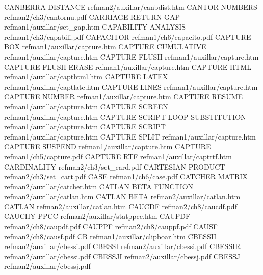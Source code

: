 CANBERRA DISTANCE                       refman2/auxillar/canbdist.htm
CANTOR NUMBERS                          refman2/ch3/cantornu.pdf
CARRIAGE RETURN GAP                     refman1/auxillar/set_gap.htm
CAPABILITY ANALYSIS                     refman1/ch3/capabili.pdf
CAPACITOR                               refman1/ch6/capacito.pdf
CAPTURE BOX                             refman1/auxillar/capture.htm
CAPTURE CUMULATIVE                      refman1/auxillar/capture.htm
CAPTURE FLUSH                           refman1/auxillar/capture.htm
CAPTURE FLUSH ERASE                     refman1/auxillar/capture.htm
CAPTURE HTML                            refman1/auxillar/capthtml.htm
CAPTURE LATEX                           refman1/auxillar/captlate.htm
CAPTURE LINES                           refman1/auxillar/capture.htm
CAPTURE NUMBER                          refman1/auxillar/capture.htm
CAPTURE RESUME                          refman1/auxillar/capture.htm
CAPTURE SCREEN                          refman1/auxillar/capture.htm
CAPTURE SCRIPT LOOP SUBSTITUTION        refman1/auxillar/capture.htm
CAPTURE SCRIPT                          refman1/auxillar/capture.htm
CAPTURE SPLIT                           refman1/auxillar/capture.htm
CAPTURE SUSPEND                         refman1/auxillar/capture.htm
CAPTURE                                 refman1/ch5/capture.pdf
CAPTURE RTF                             refman1/auxillar/captrtf.htm
CARDINALITY                             refman2/ch3/set_card.pdf
CARTESIAN PRODUCT                       refman2/ch3/set_cart.pdf
CASE                                    refman1/ch6/case.pdf
CATCHER MATRIX                          refman2/auxillar/catcher.htm
CATLAN BETA FUNCTION                    refman2/auxillar/catlan.htm
CATLAN BETA                             refman2/auxillar/catlan.htm
CATLAN                                  refman2/auxillar/catlan.htm
CAUCDF                                  refman2/ch8/caucdf.pdf
CAUCHY PPCC                             refman2/auxillar/statppcc.htm
CAUPDF                                  refman2/ch8/caupdf.pdf
CAUPPF                                  refman2/ch8/cauppf.pdf
CAUSF                                   refman2/ch8/causf.pdf
CB                                      refman1/auxillar/clipboar.htm
CBESSII                                 refman2/auxillar/cbessi.pdf
CBESSI                                  refman2/auxillar/cbessi.pdf
CBESSIR                                 refman2/auxillar/cbessi.pdf
CBESSJI                                 refman2/auxillar/cbessj.pdf
CBESSJ                                  refman2/auxillar/cbessj.pdf
